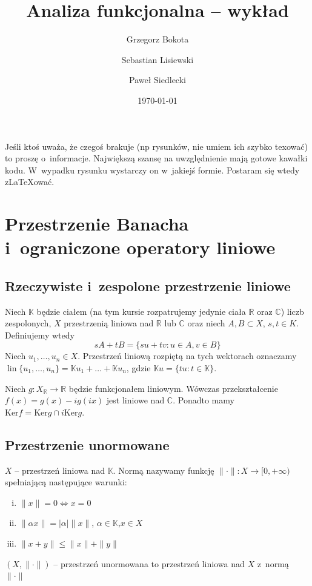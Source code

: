 \documentclass[11pt]{mwrep}
\title{Analiza funkcjonalna  -- wykład}
\author{Grzegorz Bokota \and \normalsize  Sebastian Lisiewski \and \normalsize Paweł Siedlecki}
\date{\today}
\renewcommand{\[}{\begin{equation}}
\renewcommand{\]}{\end{equation}}
\newcommand{\C}{{\ensuremath{\mathbb C}}}
\newcommand{\R}{{\ensuremath{\mathbb R}}}
\newcommand{\K}{\ensuremath{\mathbb{K}}}
\newcommand{\lin}{\operatorname{lin}}
\newcounter{numer}
\begin{document}
\setlength{\headheight}{15pt}
\pagestyle{fancy}
\maketitle
\tableofcontents
{}
Jeśli ktoś uważa, że czegoś brakuje (np rysunków, nie umiem ich szybko texować) to proszę o~informacje. 
Największą szansę na uwzględnienie mają gotowe kawałki kodu. W~wypadku rysunku wystarczy on w~jakiejś formie. Postaram się wtedy z\LaTeX ować.
\chapter{Przestrzenie Banacha i~ograniczone operatory liniowe}
\section{Rzeczywiste i~zespolone przestrzenie liniowe}
Niech $\K$ będzie ciałem (na tym kursie rozpatrujemy jedynie ciała $\R$ oraz $\C$) liczb zespolonych,
$X$ przestrzenią liniowa nad $\R$ lub $\C$ oraz niech $A,B \subset  X$, $s,t \in K$. Definiujemy wtedy
$$sA+tB = \{su + tv\colon u \in A, v\in B\}$$
Niech $u_1,\ldots ,u_n \in X $. Przestrzeń liniową rozpiętą na tych wektorach oznaczamy $\lin\{u_1,\ldots, u_n\} = \K u_1 + \ldots + \K u_n $, gdzie $\K u = \{ t u\colon t \in \K\}$. 

Niech $g: X_\R \to \R $ będzie funkcjonałem liniowym. Wówczas przekształcenie $f(x) =g(x) - ig(ix)$ jest liniowe nad $\C$. Ponadto mamy $\textrm{Ker}f = \textrm{Ker} g \cap i \textrm{Ker}g$.

\section{Przestrzenie unormowane}
$X$ -- przestrzeń liniowa nad $\K$. Normą nazywamy funkcję  $\|\cdot \|\colon X \to [0, +\infty )$ spełniającą następujące warunki:
	\begin{enumerate}[i.]
	\item $\|x\| = 0 \Leftrightarrow x=0$ 
	\item $\|\alpha x \| = |\alpha| \| x\|$, $\alpha \in \K$,$x\in X$ 
	\item $\|x+y\| \le \|x\| + \|y\|$  
\end{enumerate}
$(X,\|\cdot\|)$ -- przestrzeń unormowana to przestrzeń liniowa nad $X$ z~normą $\|\cdot\|$\\
\end{document}
